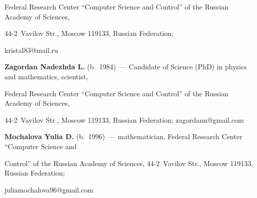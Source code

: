 Federal Research Center ``Computer Science and Control'' of the Russian Academy of Sciences, 


44-2~Vavilov Str., Moscow 119133, Russian Federation; 


\mbox{kristal83@mail.ru}





\vspace*{3pt}





\noindent


\textbf{Zagordan Nadezhda L.} (b.\ 1984)~--- Candidate of Science (PhD) in physics and mathematics, scientist, 


Federal Research Center ``Computer Science and Control'' of the Russian Academy of Sciences, 


44-2~Vavilov Str., Moscow 119133, Russian Federation; \mbox{zagordann@gmail.com}





\vspace*{3pt}





\noindent


\textbf{Mochalova Yulia D.} (b.\ 1996)~--- mathematician, Federal Research Center ``Computer Science and 


Control'' of the Russian Academy of Sciences, 44-2~Vavilov Str., Moscow 119133, Russian Federation; 


\mbox{juliamochalova96@gmail.com}





  


\label{end\stat}





\renewcommand{\bibname}{\protect\rm Литература}    


